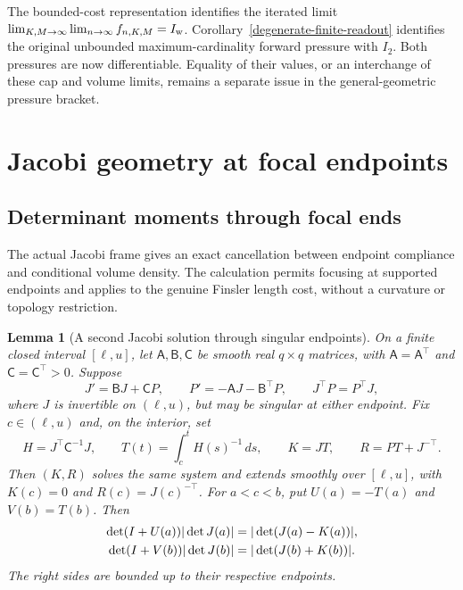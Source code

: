\documentclass[11pt,reqno]{amsart}
\newtheorem{lemma}[theorem]{Lemma}
\theoremstyle{definition}
\theoremstyle{remark}
\numberwithin{equation}{section}
\begin{document}
The bounded-cost representation identifies the iterated limit
\(\lim_{K,M\to\infty}\lim_{n\to\infty}f_{n,K,M}=I_{\rm w}\).
Corollary~\ref{degenerate-finite-readout} identifies the original
unbounded maximum-cardinality forward pressure with \(I_2\).
Both pressures are now differentiable. Equality of their values, or an
interchange of these cap and volume limits, remains a separate issue
in the general-geometric pressure bracket.

\section{Jacobi geometry at focal endpoints}\label{sec:focal-geometry}

\subsection{Determinant moments through focal ends}
\label{subsec:curved-focal-determinant-moments}

The actual Jacobi frame gives an exact cancellation between endpoint
compliance and conditional volume density. The calculation permits
focusing at supported endpoints and applies to the genuine Finsler
length cost, without a curvature or topology restriction.

\begin{lemma}[A second Jacobi solution through singular endpoints]
\label{lem:curved-jacobi-second-solution}
On a finite closed interval \([\ell,u]\), let
\(\mathsf A,\mathsf B,\mathsf C\) be smooth real \(q\times q\) matrices,
with \(\mathsf A=\mathsf A^\top\) and
\(\mathsf C=\mathsf C^\top>0\). Suppose
\[
 J'=\mathsf BJ+\mathsf CP,\qquad
 P'=-\mathsf AJ-\mathsf B^\top P,\qquad J^\top P=P^\top J,
\]
where \(J\) is invertible on \((\ell,u)\), but may be singular at
either endpoint. Fix \(c\in(\ell,u)\) and, on the interior, set
\[
 H=J^\top\mathsf C^{-1}J,\qquad
 T(t)=\int_c^t H(s)^{-1}\,ds,\qquad
 K=JT,\qquad R=PT+J^{-\top}.
\]
Then \((K,R)\) solves the same system and extends smoothly over
\([\ell,u]\), with \(K(c)=0\) and \(R(c)=J(c)^{-\top}\).
For \(a<c<b\), put \(U(a)=-T(a)\) and \(V(b)=T(b)\). Then
\begin{align}
 \det(I+U(a))|\det J(a)|&=|\det(J(a)-K(a))|,\notag\\
 \det(I+V(b))|\det J(b)|&=|\det(J(b)+K(b))|.
 \label{eq:curved-focal-determinant-cancellation}
\end{align}
The right sides are bounded up to their respective endpoints.
\end{lemma}
\end{document}
